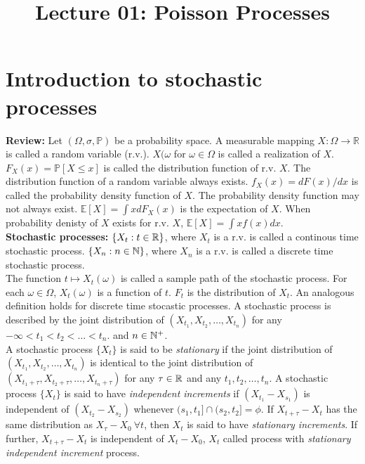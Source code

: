\documentclass[a4paper,10pt,english]{article}
\title{Lecture 01: Poisson Processes}
\author{}
\begin{document}
\maketitle
\section{Introduction to stochastic processes}

\indent \textbf{Review:} Let $(\Omega,\sigma,\mathbb{P})$ be a probability space. A measurable mapping $X:\Omega \to \mathbb{R}$ is called a random variable (r.v.). $X(\omega$ for $\omega \in \Omega$ is called a realization of $X$. $F_X (x) = \mathbb{P}[X\leq x]$ is called the distribution function of r.v. $X$. The distribution function of a random variable always exists. $f_X(x) = dF(x)/dx$ is called the probability density function of $X$. The probability density function may not always exist. $\mathbb{E}[X] = \int x dF_X(x) $ is the expectation of $X$. When probability denisty of $X$ exists for r.v. $X$, $\mathbb{E}[X] = \int xf(x)dx$.\\


\textbf{Stochastic processes:} $\{X_t : t \in \mathbb{R}\}$, where $X_t$ is a r.v. is called a continous time stochastic process. $\{X_n : n \in \mathbb{N}\}$, where $X_n$ is a r.v. is called a discrete time stochastic process. \\
\indent The function $t \mapsto X_t(\omega)$ is called a sample path of the stochastic process. For each $\omega \in \Omega$, $X_t(\omega)$ is a function of $t$. $F_t$ is the distribution of $X_t$. An analogous definition holds for discrete time stocastic processes. A stochastic process is described by the joint distribution of $(X_{t_1},X_{t_2},\ldots,X_{t_n})$ for any  $-\infty < t_1 < t_2 < \ldots < t_n.$ and $n \in \mathbb{N}^+$.\\
\indent A stochastic process $\{X_t\}$ is said to be \textit{stationary} if the joint distribution of $(X_{t_1},X_{t_2},\ldots,X_{t_n})$ is identical to the joint distribution of $(X_{t_1+\tau},X_{t_2+\tau},\ldots,X_{t_n+\tau})$ for any $\tau \in \mathbb{R}$ and any $t_1,t_2,\ldots,t_n$. A stochastic process $\{X_t\}$ is said to have \textit{independent increments} if $(X_{t_1} - X_{s_1})$ is independent of $(X_{t_2} -X_{s_2})$ whenever $(s_1,t_1] \cap (s_2,t_2] = \phi$. If $X_{t+\tau} - X_t$ has the same distribution as $X_\tau - X_0\ \forall t$, then $X_t$ is said to have \textit{stationary increments}. If further, $X_{t+\tau} - X_t$ is independent of $X_t - X_0$, $X_t$ called process with \textit{stationary independent increment} process. \\
\end{document}
